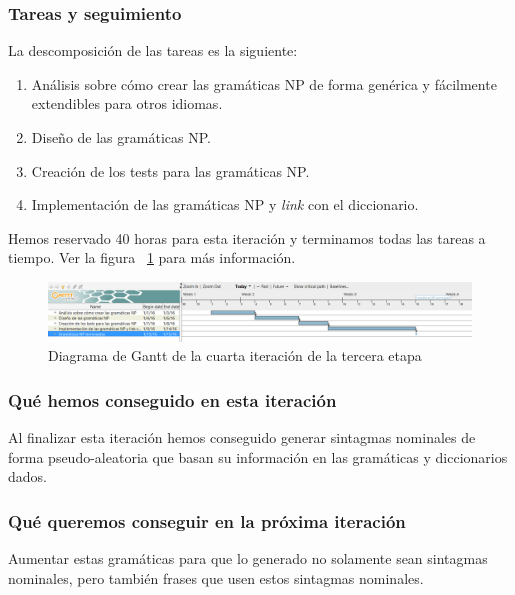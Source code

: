 \subsubsection{Tareas y seguimiento}

La descomposición de las tareas es la siguiente:

\begin{enumerate}[label=\bfseries WBS 4.\arabic*]
  \item Análisis sobre cómo crear las gramáticas NP de forma genérica y fácilmente extendibles para otros idiomas.
  \item Diseño de las gramáticas NP.
  \item Creación de los tests para las gramáticas NP.
  \item Implementación de las gramáticas NP y \textit{link} con el diccionario.
\end{enumerate}

Hemos reservado 40 horas para esta iteración y terminamos todas las tareas a tiempo. Ver la figura ~\ref{fig:sec3it4} para más información.

\begin{figure}
    \includegraphics[width=\textwidth,height=\textheight,keepaspectratio]{./img/sec3it4.png}
  \caption{Diagrama de Gantt de la cuarta iteración de la tercera etapa}
  \label{fig:sec3it4}
\end{figure}

\subsubsection{Qué hemos conseguido en esta iteración}

Al finalizar esta iteración hemos conseguido generar sintagmas nominales de forma pseudo-aleatoria que basan su información en las gramáticas y diccionarios dados.

\subsubsection{Qué queremos conseguir en la próxima iteración}

Aumentar estas gramáticas para que lo generado no solamente sean sintagmas nominales, pero también frases que usen estos sintagmas nominales.

